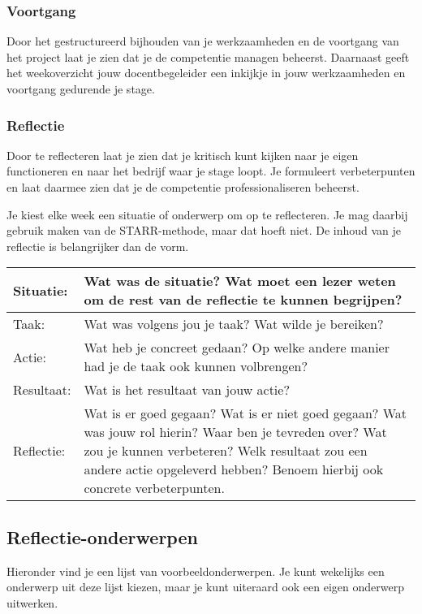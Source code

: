 \documentclass[a4paper,12pt]{article}
\begin{document}
\subsubsection*{Voortgang}
Door het gestructureerd bijhouden van je werkzaamheden en de voortgang van het project laat je zien dat je de competentie managen beheerst. Daarnaast geeft het weekoverzicht jouw docentbegeleider een inkijkje in jouw werkzaamheden en voortgang gedurende je stage.

\subsubsection*{Reflectie}
Door te reflecteren laat je zien dat je kritisch kunt kijken naar je eigen functioneren en naar het bedrijf waar je stage loopt. Je formuleert verbeterpunten en laat daarmee zien dat je de competentie professionaliseren beheerst.

Je kiest elke week een situatie of onderwerp om op te reflecteren. Je mag daarbij gebruik maken van de STARR-methode, maar dat hoeft niet. De inhoud van je reflectie is belangrijker dan de vorm.

\begin{longtable}{|l|p{}|}
\hline
Situatie:   & Wat was de situatie? Wat moet een lezer weten om de rest van de reflectie te kunnen begrijpen? \\ \hline
Taak:   & Wat was volgens jou je taak? Wat wilde je bereiken?  \\ \hline
Actie:  & Wat heb je concreet gedaan? Op welke andere manier had je de taak ook kunnen volbrengen? \\ \hline
Resultaat: & Wat is het resultaat van jouw actie? \\ \hline
Reflectie:   & Wat is er goed gegaan? Wat is er niet goed gegaan? Wat was jouw rol hierin? Waar ben je tevreden over? Wat zou je kunnen verbeteren? Welk resultaat zou een andere actie opgeleverd hebben? Benoem hierbij ook concrete verbeterpunten. \\ \hline

\hline

\end{longtable}

\subsection*{Reflectie-onderwerpen}
Hieronder vind je een lijst van voorbeeldonderwerpen. Je kunt wekelijks een onderwerp uit deze lijst kiezen, maar je kunt uiteraard ook een eigen onderwerp uitwerken.
\end{document}
